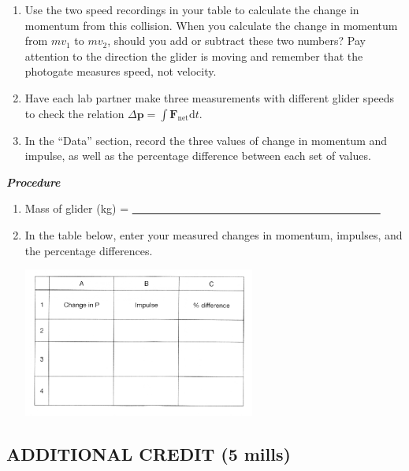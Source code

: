 \begin{enumerate}[label=\arabic*.]
\item Use the two speed recordings in your table to calculate the change in momentum from this collision.  When you calculate the change in momentum from \(mv_1\) to \(mv_2\), should you add or subtract these two numbers?  Pay attention to the direction the glider is moving and remember that the photogate measures speed, not velocity.

\item Have each lab partner make three measurements with different glider speeds to check the relation \(\Delta\textbf{p} = \int \textbf{F}_{\textrm{net}} \textrm{d}t\).  


\item In the ``Data'' section, record the three values of change in momentum and impulse, as well as the percentage difference between each set of values.

\end{enumerate}

\textbf{\textit{Procedure}}

\begin{enumerate}[start=2]

\item Mass of glider (kg) = \ul{~~~~~~~~~~~~~~~~~~~~~~~~~~~~~~~~~~~~~~~~~~~~~}

\setcounter{enumi}{11}
\item In the table below, enter your measured changes in momentum, impulses, and the percentage differences.
\begin{center} \includegraphics*[width=0.6\textwidth]{imgs/6labs/6Alab/6Aexp5/M_Itable_sm.png} \end{center}

\end{enumerate}

\subsection*{ADDITIONAL CREDIT (5 mills)}

